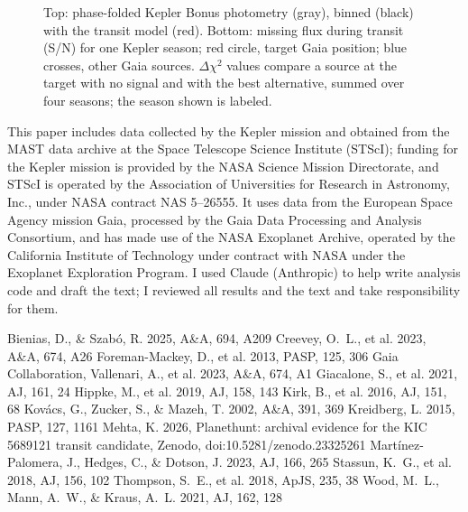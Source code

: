 \documentclass[RNAAS]{aastex701}
\begin{document}
\begin{figure}[ht!]
\caption{Top: phase-folded Kepler Bonus photometry (gray), binned (black) with the transit model (red). Bottom: missing flux during transit (S/N) for one Kepler season; red circle, target Gaia position; blue crosses, other Gaia sources. $\Delta\chi^2$ values compare a source at the target with no signal and with the best alternative, summed over four seasons; the season shown is labeled.\label{fig}}
\end{figure}

\begin{acknowledgments}
This paper includes data collected by the Kepler mission and obtained from the MAST data archive at the Space Telescope Science Institute (STScI); funding for the Kepler mission is provided by the NASA Science Mission Directorate, and STScI is operated by the Association of Universities for Research in Astronomy, Inc., under NASA contract NAS 5--26555. It uses data from the European Space Agency mission Gaia, processed by the Gaia Data Processing and Analysis Consortium, and has made use of the NASA Exoplanet Archive, operated by the California Institute of Technology under contract with NASA under the Exoplanet Exploration Program. I used Claude (Anthropic) to help write analysis code and draft the text; I reviewed all results and the text and take responsibility for them.
\end{acknowledgments}


\begin{thebibliography}{}
 Bienias, D., \& Szab\'o, R. 2025, A\&A, 694, A209
 Creevey, O.~L., et al. 2023, A\&A, 674, A26
 Foreman-Mackey, D., et al. 2013, PASP, 125, 306
 Gaia Collaboration, Vallenari, A., et al. 2023, A\&A, 674, A1
 Giacalone, S., et al. 2021, AJ, 161, 24
 Hippke, M., et al. 2019, AJ, 158, 143
 Kirk, B., et al. 2016, AJ, 151, 68
 Kov\'acs, G., Zucker, S., \& Mazeh, T. 2002, A\&A, 391, 369
 Kreidberg, L. 2015, PASP, 127, 1161
 Mehta, K. 2026, Planethunt: archival evidence for the KIC 5689121 transit candidate, Zenodo, doi:10.5281/zenodo.23325261
 Mart\'inez-Palomera, J., Hedges, C., \& Dotson, J. 2023, AJ, 166, 265
 Stassun, K.~G., et al. 2018, AJ, 156, 102
 Thompson, S.~E., et al. 2018, ApJS, 235, 38
 Wood, M.~L., Mann, A.~W., \& Kraus, A.~L. 2021, AJ, 162, 128
\end{thebibliography}
\end{document}

